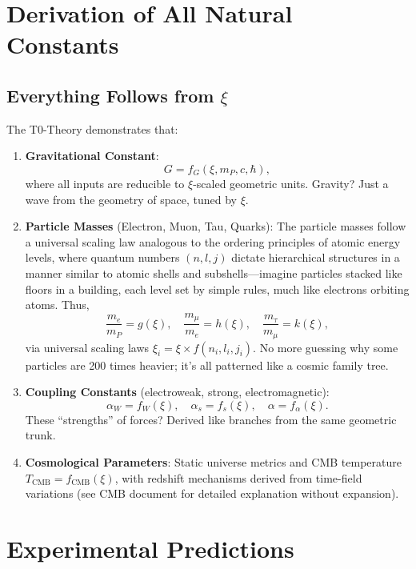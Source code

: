 	\section{Derivation of All Natural Constants}
	
	\subsection{Everything Follows from $\xi$}
	The T0-Theory demonstrates that:
	
	\begin{enumerate}
		\item \textbf{Gravitational Constant}:
		\[
		G = f_G(\xi, m_P, c, \hbar),
		\]
		where all inputs are reducible to $\xi$-scaled geometric units. Gravity? Just a wave from the geometry of space, tuned by $\xi$.
		
		\item \textbf{Particle Masses} (Electron, Muon, Tau, Quarks):
		The particle masses follow a universal scaling law analogous to the ordering principles of atomic energy levels, where quantum numbers $(n, l, j)$ dictate hierarchical structures in a manner similar to atomic shells and subshells—imagine particles stacked like floors in a building, each level set by simple rules, much like electrons orbiting atoms. Thus,
		\[
		\frac{m_e}{m_P} = g(\xi), \quad \frac{m_\mu}{m_e} = h(\xi), \quad \frac{m_\tau}{m_\mu} = k(\xi),
		\]
		via universal scaling laws $\xi_i = \xi \times f(n_i, l_i, j_i)$. No more guessing why some particles are 200 times heavier; it's all patterned like a cosmic family tree.
		
		\item \textbf{Coupling Constants} (electroweak, strong, electromagnetic):
		\[
		\alpha_W = f_W(\xi), \quad \alpha_s = f_s(\xi), \quad \alpha = f_\alpha(\xi).
		\]
		These ``strengths'' of forces? Derived like branches from the same geometric trunk.
		
		\item \textbf{Cosmological Parameters}:
		Static universe metrics and CMB temperature $T_{\text{CMB}} = f_{\text{CMB}}(\xi)$, with redshift mechanisms derived from time-field variations (see CMB document for detailed explanation without expansion).
	\end{enumerate}
	
	\section{Experimental Predictions}
	
